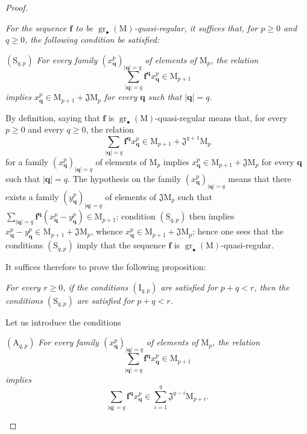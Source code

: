 \begin{proof}
\begin{env}[19.5.5.2]
\label{IV.19.5.5.2}
\emph{For the sequence $\mathbf{f}$ to be $\operatorname{gr}_\bullet(\mathrm{M})$-quasi-regular, it suffices that, for $p\geqslant 0$ and $q\geqslant 0$, the following condition be satisfied:}

$(\mathrm{S}_{q,p})$ \emph{For every family $(x_\mathbf{q}^p)_{|\mathbf{q}|=q}$ of elements of $\mathrm{M}_p$, the relation}
\[
  \textstyle\sum_{|\mathbf{q}|=q}\mathbf{f}^\mathbf{q}x_\mathbf{q}^p\in\mathrm{M}_{p+1}
\]
\emph{implies $x_\mathbf{q}^p\in\mathrm{M}_{p+1}+\mathfrak{J}\mathrm{M}_p$ for every $\mathbf{q}$ such that $|\mathbf{q}|=q$.}

By definition, saying that $\mathbf{f}$ is $\operatorname{gr}_\bullet(\mathrm{M})$-quasi-regular means that, for every $p\geqslant 0$ and every $q\geqslant 0$, the relation
\[
  \textstyle\sum_{|\mathbf{q}|=q}\mathbf{f}^\mathbf{q} x_\mathbf{q}^p\in\mathrm{M}_{p+1}+\mathfrak{J}^{q+1}\mathrm{M}_p
\]
for a family $(x_\mathbf{q}^p)_{|\mathbf{q}|=q}$ of elements of $\mathrm{M}_p$ implies $x_\mathbf{q}^p\in\mathrm{M}_{p+1}+\mathfrak{J}\mathrm{M}_p$ for every $\mathbf{q}$ such that $|\mathbf{q}|=q$. The hypothesis on the family $(x_\mathbf{q}^p)_{|\mathbf{q}|=q}$ means that there exists a family $(y_\mathbf{q}^p)_{|\mathbf{q}|=q}$ of elements of $\mathfrak{J}\mathrm{M}_p$ such that $\sum_{|\mathbf{q}|=q}\mathbf{f}^\mathbf{q}(x_\mathbf{q}^p-y_\mathbf{q}^p)\in\mathrm{M}_{p+1}$; condition $(\mathrm{S}_{q,p})$ then implies $x_\mathbf{q}^p-y_\mathbf{q}^p\in\mathrm{M}_{p+1}+\mathfrak{J}\mathrm{M}_p$, whence $x_\mathbf{q}^p\in\mathrm{M}_{p+1}+\mathfrak{J}\mathrm{M}_p$; hence one sees that the conditions $(\mathrm{S}_{q,p})$ imply that the sequence $\mathbf{f}$ is $\operatorname{gr}_\bullet(\mathrm{M})$-quasi-regular.
\end{env}

It suffices therefore to prove the following proposition:

\begin{env}[19.5.5.3]
\label{IV.19.5.5.3}
\emph{For every $r\geqslant 0$, if the conditions $(\mathrm{I}_{q,p})$ are satisfied for $p+q<r$, then the conditions $(\mathrm{S}_{q,p})$ are satisfied for $p+q<r$.}

Let us introduce the conditions

$(\mathrm{A}_{q,p})$ \emph{For every family $(x_\mathbf{q}^p)_{|\mathbf{q}|=q}$ of elements of $\mathrm{M}_p$, the relation}
\[
  \textstyle\sum_{|\mathbf{q}|=q}\mathbf{f}^\mathbf{q}x_\mathbf{q}^p\in\mathrm{M}_{p+1}
\]
\emph{implies}
\[
  \textstyle\sum_{|\mathbf{q}|=q}\mathbf{f}^\mathbf{q}x_\mathbf{q}^p
  \in\textstyle\sum_{i=1}^{q}\mathfrak{J}^{q-i}\mathrm{M}_{p+i}.
\]


\end{env}
\end{proof}
